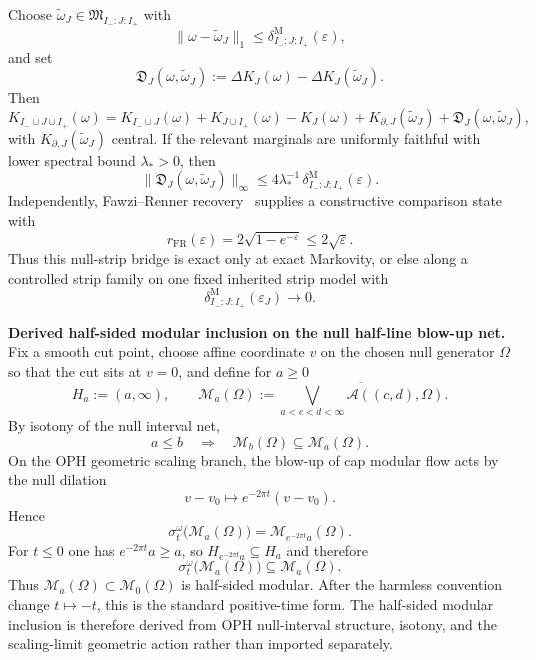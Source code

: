 Choose \(\widetilde\omega_J\in \mathfrak M_{I_-:J:I_+}\) with
\[
\|\omega-\widetilde\omega_J\|_1
\le
\delta^{\mathrm M}_{I_-:J:I_+}(\varepsilon),
\]
and set
\[
\mathfrak D_J(\omega,\widetilde\omega_J)
:=
\Delta K_J(\omega)-\Delta K_J(\widetilde\omega_J).
\]
Then
\[
K_{I_-\cup J\cup I_+}(\omega)
=
K_{I_-\cup J}(\omega)+K_{J\cup I_+}(\omega)-K_J(\omega)
+K_{\partial,J}(\widetilde\omega_J)
+\mathfrak D_J(\omega,\widetilde\omega_J),
\]
with \(K_{\partial,J}(\widetilde\omega_J)\) central. If the relevant marginals are uniformly faithful with lower spectral bound \(\lambda_\ast>0\), then
\[
\|\mathfrak D_J(\omega,\widetilde\omega_J)\|_\infty
\le
4\lambda_\ast^{-1}\,
\delta^{\mathrm M}_{I_-:J:I_+}(\varepsilon).
\]
Independently, Fawzi--Renner recovery~\cite{fawziRenner15} supplies a constructive comparison state with
\[
r_{\mathrm{FR}}(\varepsilon)
=
2\sqrt{1-e^{-\varepsilon}}
\le
2\sqrt{\varepsilon}.
\]
Thus this null-strip bridge is exact only at exact Markovity, or else along a controlled strip family on one fixed inherited strip model with
\[
\delta^{\mathrm M}_{I_-:J:I_+}(\varepsilon_J)\to 0.
\]

\textbf{Derived half-sided modular inclusion on the null half-line blow-up net.} Fix a smooth cut point, choose affine coordinate \(v\) on the chosen null generator \(\Omega\) so that the cut sits at \(v=0\), and define for \(a\ge 0\)
\[
H_a:=(a,\infty),
\qquad
\mathcal M_a(\Omega)
:=
\overline{\bigvee_{a<c<d<\infty}\mathcal A((c,d),\Omega)}.
\]
By isotony of the null interval net,
\[
a\le b
\quad\Longrightarrow\quad
\mathcal M_b(\Omega)\subseteq \mathcal M_a(\Omega).
\]
On the OPH geometric scaling branch, the blow-up of cap modular flow acts by the null dilation
\[
v-v_0\mapsto e^{-2\pi t}(v-v_0).
\]
Hence
\[
\sigma_t^\omega\bigl(\mathcal M_a(\Omega)\bigr)
=
\mathcal M_{e^{-2\pi t}a}(\Omega).
\]
For \(t\le 0\) one has \(e^{-2\pi t}a\ge a\), so \(H_{e^{-2\pi t}a}\subseteq H_a\) and therefore
\[
\sigma_t^\omega\bigl(\mathcal M_a(\Omega)\bigr)\subseteq \mathcal M_a(\Omega).
\]
Thus \(\mathcal M_a(\Omega)\subset \mathcal M_0(\Omega)\) is half-sided modular. After the harmless convention change \(t\mapsto -t\), this is the standard positive-time form. The half-sided modular inclusion is therefore derived from OPH null-interval structure, isotony, and the scaling-limit geometric action rather than imported separately.

